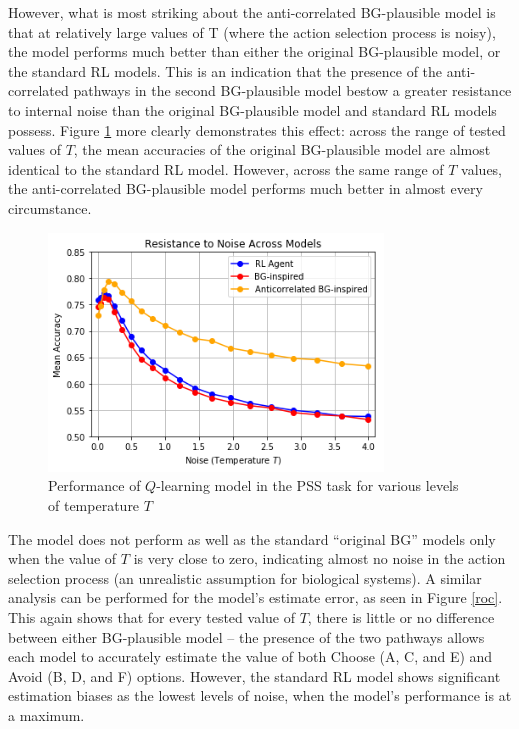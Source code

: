 \documentclass[10pt,letterpaper]{article}
\begin{document}
However, what is most striking about the anti-correlated BG-plausible model is that at relatively large values of T (where the action selection process is noisy), the model performs much better than either the original BG-plausible model, or the standard RL models. This is an indication that the presence of the anti-correlated pathways in the second BG-plausible model bestow a greater resistance to internal noise than the original BG-plausible model and standard RL models possess. Figure \ref{resistance-to-noise} more clearly demonstrates this effect: across the range of tested values of $T$, the mean accuracies of the original BG-plausible model are almost identical to the standard RL model. However, across the same range of $T$ values, the anti-correlated BG-plausible model performs much better in almost every circumstance.

\begin{figure}[ht]
	\begin{center}
		\includegraphics[width=3.5in]{resistance-to-noise.png}
	\end{center}
	\caption{Performance of $Q$-learning model in the PSS task for various levels of temperature $T$} 
	\label{resistance-to-noise}
\end{figure}

The model does not perform as well as the standard ``original BG'' models only when the value of $T$ is very close to zero, indicating almost no noise in the action selection process (an unrealistic assumption for biological systems). A similar analysis can be performed for the model's estimate error, as seen in Figure \ref{roc}. This again shows that for every tested value of $T$, there is little or no difference between either BG-plausible model -- the presence of the two pathways allows each model to accurately estimate the value of both Choose (A, C, and E) and Avoid (B, D, and F) options. However, the standard RL model shows significant estimation biases as the lowest levels of noise, when the model's performance is at a maximum.
\end{document}
